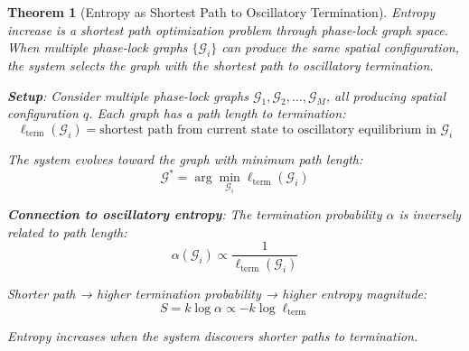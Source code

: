 \documentclass[12pt,a4paper]{article}
\newtheorem{theorem}{Theorem}[section]
\theoremstyle{remark}
\begin{document}
\begin{theorem}[Entropy as Shortest Path to Oscillatory Termination]
\label{thm:entropy_shortest_path}
Entropy increase is a shortest path optimization problem through phase-lock graph space. When multiple phase-lock graphs $\{\mathcal{G}_i\}$ can produce the same spatial configuration, the system selects the graph with the shortest path to oscillatory termination.

\textbf{Setup}: Consider multiple phase-lock graphs $\mathcal{G}_1, \mathcal{G}_2, \ldots, \mathcal{G}_M$, all producing spatial configuration $q$. Each graph has a path length to termination:
\begin{equation}
\ell_{\text{term}}(\mathcal{G}_i) = \text{shortest path from current state to oscillatory equilibrium in } \mathcal{G}_i
\end{equation}

The system evolves toward the graph with minimum path length:
\begin{equation}
\mathcal{G}^* = \arg\min_{\mathcal{G}_i} \ell_{\text{term}}(\mathcal{G}_i)
\end{equation}

\textbf{Connection to oscillatory entropy}: The termination probability $\alpha$ is inversely related to path length:
\begin{equation}
\alpha(\mathcal{G}_i) \propto \frac{1}{\ell_{\text{term}}(\mathcal{G}_i)}
\end{equation}

Shorter path → higher termination probability → higher entropy magnitude:
\begin{equation}
S = k \log \alpha \propto -k \log \ell_{\text{term}}
\end{equation}

Entropy increases when the system discovers shorter paths to termination.
\end{theorem}
\end{document}
